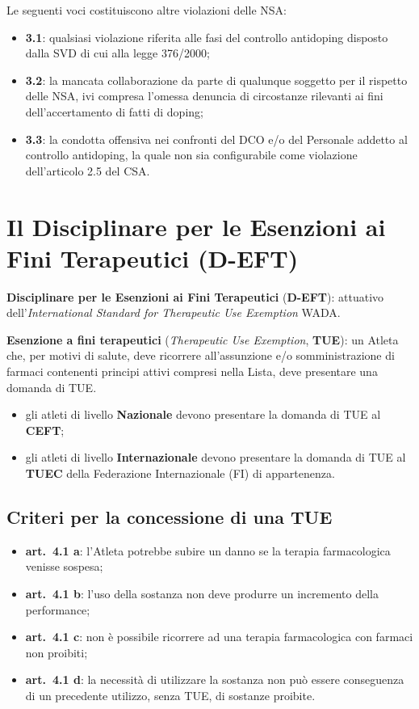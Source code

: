 Le seguenti voci costituiscono altre violazioni delle NSA:
\begin{itemize}
  \item \textbf{3.1}: qualsiasi violazione riferita alle fasi del controllo antidoping disposto
    dalla SVD di cui alla legge 376/2000;
  \item \textbf{3.2}: la mancata collaborazione da parte di qualunque soggetto per il rispetto
    delle NSA, ivi compresa l'omessa denuncia di circostanze rilevanti ai fini dell'accertamento
    di fatti di doping;
  \item \textbf{3.3}: la condotta offensiva nei confronti del DCO e/o del Personale addetto al
    controllo antidoping, la quale non sia configurabile come violazione dell'articolo 2.5 del
    CSA.
\end{itemize}

\section{Il Disciplinare per le Esenzioni ai Fini Terapeutici (D-EFT)}

\textbf{Disciplinare per le Esenzioni ai Fini Terapeutici} (\textbf{D-EFT}): attuativo
dell'\textit{International Standard for Therapeutic Use Exemption} WADA.

\textbf{Esenzione a fini terapeutici} (\textit{Therapeutic Use Exemption}, \textbf{TUE}): un
Atleta che, per motivi di salute, deve ricorrere all'assunzione e/o somministrazione di farmaci
contenenti principi attivi compresi nella Lista, deve presentare una domanda di TUE.
\begin{itemize}
  \item gli atleti di livello \textbf{Nazionale} devono presentare la domanda di TUE al
    \textbf{CEFT};
  \item gli atleti di livello \textbf{Internazionale} devono presentare la domanda di TUE al
    \textbf{TUEC} della Federazione Internazionale (FI) di appartenenza.
\end{itemize}

\subsection{Criteri per la concessione di una TUE}

\begin{itemize}
  \item \textbf{art.\ 4.1 a}: l'Atleta potrebbe subire un danno se la terapia farmacologica
    venisse sospesa;
  \item \textbf{art.\ 4.1 b}: l'uso della sostanza non deve produrre un incremento della
    performance;
  \item \textbf{art.\ 4.1 c}: non è possibile ricorrere ad una terapia farmacologica con farmaci
    non proibiti;
  \item \textbf{art.\ 4.1 d}: la necessità di utilizzare la sostanza non può essere conseguenza
    di un precedente utilizzo, senza TUE, di sostanze proibite.
\end{itemize}

